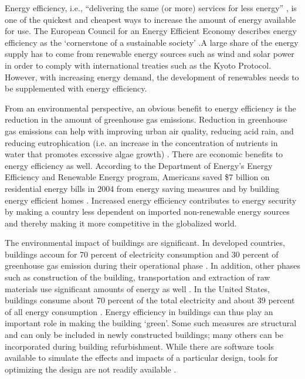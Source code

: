 Energy efficiency, i.e., ``delivering the same (or more) services for less energy'' \cite{epa}, is one of the quickest and cheapest ways to increase the amount of energy available for use. The European Council for an Energy Efficient Economy describes energy efficiency  as the `cornerstone of a sustainable society' \cite{ecees}.A large share of the energy supply has to come from renewable energy sources such as wind and solar power in order to comply with international treaties such as the Kyoto Protocol. However, with increasing energy demand, the development of renewables needs to be supplemented with energy efficiency.

From an environmental perspective, an obvious benefit to energy efficiency is 
the reduction in the amount of greenhouse gas emissions. Reduction in greenhouse gas emissions can help with  improving urban air quality, reducing acid rain, and reducing eutrophication (i.e. an increase in the concentration of nutrients in water that promotes excessive algae growth) \cite{ecees}. There are economic benefits to energy efficiency as well. According to the Department of Energy's Energy Efficiency and Renewable Energy program, Americans saved \$7 billion on residential energy bills in 2004 from energy saving measures and by building energy efficient homes \cite{wri}. Increased energy efficiency contributes to energy security by making a country less dependent on imported non-renewable energy sources and thereby making it more competitive in the globalized world.

The environmental impact of buildings are significant. In developed countries, buildings accoun for 70 percent of electricity consumption and 30 percent of greenhouse gas emission during their operational phase \cite{Castro-Lacouture2009}. In addition, other phases such as construction of the building, transportation and extraction of raw materials use significant amounts of energy as well \cite{Castro-Lacouture2009}. In the United States, buildings consume about 70 percent of the total electricity and about 39 percent of all energy consumption \cite{Wang2005a}. Energy efficiency in buildings can thus play an important role in making the building `green'. Some such measures are structural and can only be included in newly constructed buildings; many others can be incorporated during building refurbishment. While there are software tools available to simulate the effects and impacts of a particular design, tools for optimizing the design are not readily available \cite{Wang2005b} \cite{Pernodet2009}.

